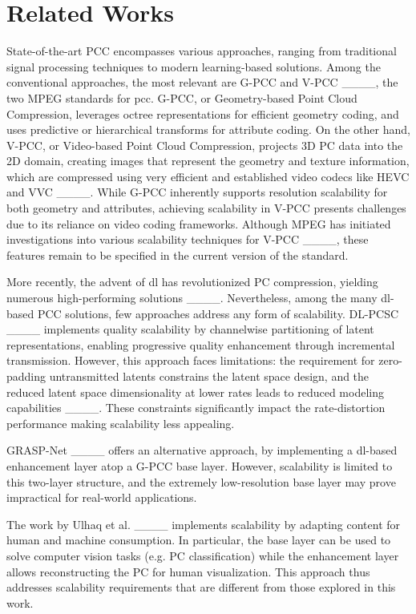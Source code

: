 \section{Related Works}
\label{sec:related}
State-of-the-art PCC encompasses various approaches, ranging from traditional signal processing techniques to modern learning-based solutions. Among the conventional approaches, the most relevant are G-PCC and V-PCC ____, the two MPEG standards for \gls{pcc}.
G-PCC, or Geometry-based Point Cloud Compression, leverages octree representations for efficient geometry coding, and uses predictive or hierarchical transforms for attribute coding. On the other hand, V-PCC, or Video-based Point Cloud Compression, projects 3D PC data into the 2D domain, creating images that represent the geometry and texture information, which are compressed using very efficient and established video codecs like HEVC and VVC ____.
While G-PCC inherently supports resolution scalability for both geometry and attributes, achieving scalability in V-PCC presents challenges due to its reliance on video coding frameworks. Although MPEG has initiated investigations into various scalability techniques for V-PCC ____, these features remain to be specified in the current version of the standard.

More recently, the advent of \gls{dl} has revolutionized PC compression, yielding numerous high-performing solutions ____. Nevertheless, among the many \gls{dl}-based PCC solutions, few approaches address any form of scalability. DL-PCSC ____ implements quality scalability by channelwise partitioning of latent representations, enabling progressive quality enhancement through incremental transmission. However, this approach faces limitations: the requirement for zero-padding untransmitted latents constrains the latent space design, and the reduced latent space dimensionality at lower rates leads to reduced modeling capabilities ____. These constraints significantly impact the rate-distortion performance making scalability less appealing.

GRASP-Net ____ offers an alternative approach, by implementing a \gls{dl}-based enhancement layer atop a G-PCC base layer. However, scalability is limited to this two-layer structure, and the extremely low-resolution base layer may prove impractical for real-world applications.

The work by Ulhaq et al. ____ implements scalability by adapting content for human and machine consumption. In particular, the base layer can be used to solve computer vision tasks (e.g. PC classification) while the enhancement layer allows reconstructing the PC for human visualization. This approach thus addresses scalability requirements that are different from those explored in this work.

